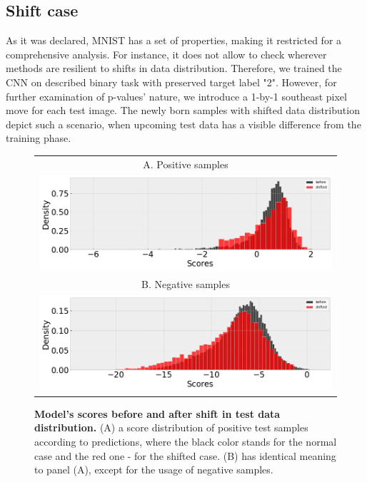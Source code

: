 \documentclass{article}
\begin{document}
\subsection{Shift case}

As it was declared, MNIST has a set of properties, making it restricted for a comprehensive analysis. For instance, it does not allow to check wherever methods are resilient to shifts in data distribution. Therefore, we trained the CNN on described binary task with preserved target label "2". However, for further examination of p-values’ nature, we introduce a 1-by-1 southeast pixel move for each test image. The newly born samples with shifted data distribution depict such a scenario, when upcoming test data has a visible difference from the training phase. 

\begin{figure}
    \centering
        \begin{tabular}{c}
 		A. Positive samples \\ \includegraphics[width=6in]{img/shift_score_pos.png} \\
		B. Negative samples \\ \includegraphics[width=6in]{img/shift_score_neg.png}
	\end{tabular}
	\caption{{\bf   Model's scores before and after shift in test data distribution.}
        (A) a score distribution of positive test samples according to predictions, where the black color stands for the normal case and the red one - for the shifted case. (B) has identical meaning to panel (A), except for the usage of negative samples.}
	\label{fig:scores}
\end{figure}
\end{document}

